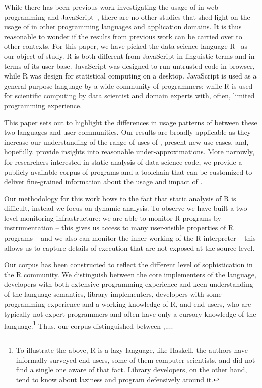 \documentclass[conference]{IEEEtran}
\begin{document}
While there has been previous work investigating the usage of \eval in web
programming and JavaScript~\cite{ecoop11}, there are no other studies that
shed light on the usage of \eval in other programming languages and
application domains.  It is thus reasonable to wonder if the results from
previous work can be carried over to other contexts. For this paper, we have
picked the data science language R~\cite{r} as our object of study. R is
both different from JavaScript in linguistic terms and in terms of its user
base. JavaScript was designed to run untrusted code in browser, while R was
design for statistical computing on a desktop. JavaScript is used as a
general purpose language by a wide community of programmers; while R is used
for scientific computing by data scientist and domain experts with, often,
limited programming experience.

This paper sets out to highlight the differences in usage patterns of \eval
between these two languages and user communities. Our results are broadly
applicable as they increase our understanding of the range of uses of \eval,
present new use-cases, and, hopefully, provide insights into reasonable
under-approximations. More narrowly, for researchers interested in static
analysis of data science code, we provide a publicly available corpus of
programs and a toolchain that can be customized to deliver fine-grained
information about the usage and impact of \eval.

Our methodology for this work bows to the fact that static analysis of R is
difficult, instead we focus on dynamic analysis. To observe \eval we have
built a two-level monitoring infrastructure: we are able to monitor R
programs by instrumentation -- this gives us access to many user-visible
properties of R programs -- and we also can monitor the inner working of the
R interpreter -- this allows us to capture details of execution that are not
exposed at the source level.

Our corpus has been constructed to reflect the different level of
sophistication in the R community. We distinguish between the core
implementers of the language, developers with both extensive programming
experience and keen understanding of the language semantics, library
implementers, developers with some programming experience and a working
knowledge of R, and end-users, who are typically not expert programmers and
often have only a cursory knowledge of the language.\footnote{To illustrate
  the above, R is a lazy language, like Haskell, the authors have informally
  surveyed end-users, some of them computer scientists, and did not find a
  single one aware of that fact. Library developers, on the other hand, tend
  to know about laziness and program defensively around it.} Thus, our
corpus distinguished between ,....
\end{document}
